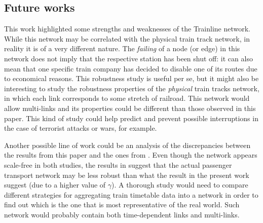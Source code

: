 \subsection{Future works}
This work highlighted some strengths and weaknesses of the Trainline network. While this network may be correlated with the physical train track network, in reality it is of a very different nature. The \emph{failing} of a node (or edge) in this network does not imply that the respective station has been shut off: it can also mean that one specific train company has decided to disable one of its routes due to economical reasons.
This robustness study is useful per se, but it might also be interesting to study the robustness properties of the \emph{physical} train tracks network, in which each link corresponds to some stretch of railroad. This network would allow multi-links and its properties could be different than those observed in this paper. This kind of study could help predict and prevent possible interruptions in the case of terrorist attacks or wars, for example.

Another possible line of work could be an analysis of the discrepancies between the results from this paper and the ones from \cite{gamma4}. Even though the network appears scale-free in both studies, the results in \cite{gamma4} suggest that the actual passenger transport network may be less robust than what the result in the present work suggest (due to a higher value of $\gamma$). A thorough study would need to compare different strategies for aggregating train timetable data into a network in order to find out which is the one that is most representative of the real world. Such network would probably contain both time-dependent links and multi-links.